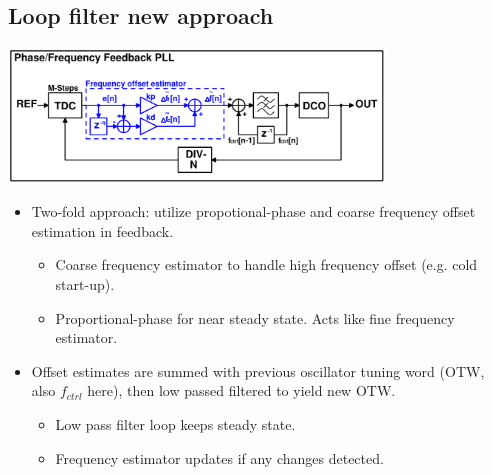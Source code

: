 \documentclass[10pt,a4paper]{article}
\begin{document}
		\subsection{Loop filter new approach}
		\vspace{-0.5em}
		\center\includegraphics[width=0.75\textwidth, angle=0]{figs/more_advanced.pdf}
		\vspace{-0.5em}
		\begin{itemize}
			\footnotesize
			\item Two-fold approach: utilize propotional-phase and coarse frequency offset estimation in feedback.
			\begin{itemize}
				\scriptsize
				\item Coarse frequency estimator to handle high frequency offset (e.g. cold start-up).	
				\item Proportional-phase for near steady state. Acts like fine frequency estimator.
			\end{itemize}
			\item Offset estimates are summed with previous oscillator tuning word (OTW, also $f_{ctrl}$ here), then low passed filtered to yield new OTW. 
			\begin{itemize}
				\scriptsize
				\item Low pass filter loop keeps steady state.	
				\item Frequency estimator updates if any changes detected.
			\end{itemize}			
		\end{itemize} 	
		\flushleft
\end{document}
